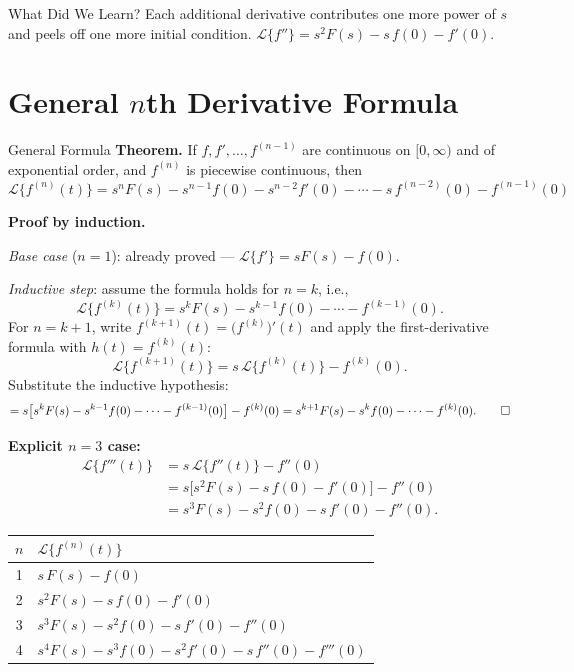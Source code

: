 \documentclass[12pt,a4paper]{article}
\begin{document}
\begin{learnbox}{What Did We Learn?}
Each additional derivative contributes one more power of $s$ and peels
off one more initial condition. $\mathcal{L}\{f''\} = s^2F(s) -
s\,f(0) - f'(0)$.
\end{learnbox}

\section{General \texorpdfstring{$n$}{n}th Derivative Formula}

\begin{infobox}{General Formula}
\textbf{Theorem.} If $f, f', \ldots, f^{(n-1)}$ are continuous on
$[0,\infty)$ and of exponential order, and $f^{(n)}$ is piecewise
continuous, then
\[
  \boxed{
    \mathcal{L}\{f^{(n)}(t)\}
    = s^n F(s)
    - s^{n-1}f(0)
    - s^{n-2}f'(0)
    - \cdots
    - s\,f^{(n-2)}(0)
    - f^{(n-1)}(0)
  }
\]

\medskip
\textbf{Proof by induction.}

\emph{Base case} ($n=1$): already proved --- $\mathcal{L}\{f'\} =
sF(s) - f(0)$. \checkmark

\emph{Inductive step}: assume the formula holds for $n=k$, i.e.,
\[
  \mathcal{L}\{f^{(k)}(t)\}
  = s^k F(s) - s^{k-1}f(0) - \cdots - f^{(k-1)}(0).
\]
For $n = k+1$, write $f^{(k+1)}(t) = \bigl(f^{(k)}\bigr)'(t)$ and apply
the first-derivative formula with $h(t) = f^{(k)}(t)$:
\[
  \mathcal{L}\{f^{(k+1)}(t)\}
  = s\,\mathcal{L}\{f^{(k)}(t)\} - f^{(k)}(0).
\]
Substitute the inductive hypothesis:
\[
  = s\bigl[s^k F(s) - s^{k-1}f(0) - \cdots - f^{(k-1)}(0)\bigr]
    - f^{(k)}(0)
  = s^{k+1}F(s) - s^k f(0) - \cdots - f^{(k)}(0). \qed
\]

\medskip
\textbf{Explicit $n=3$ case:}
\begin{align*}
  \mathcal{L}\{f'''(t)\}
  &= s\,\mathcal{L}\{f''(t)\} - f''(0) \\
  &= s\bigl[s^2 F(s) - s\,f(0) - f'(0)\bigr] - f''(0) \\
  &= s^3 F(s) - s^2 f(0) - s\,f'(0) - f''(0).
\end{align*}
\end{infobox}

\medskip
\begin{center}
\begin{tabular}{@{}c l@{}}
\toprule
$n$ & $\mathcal{L}\{f^{(n)}(t)\}$ \\
\midrule
1 & $s\,F(s) - f(0)$ \\
2 & $s^2 F(s) - s\,f(0) - f'(0)$ \\
3 & $s^3 F(s) - s^2 f(0) - s\,f'(0) - f''(0)$ \\
4 & $s^4 F(s) - s^3 f(0) - s^2 f'(0) - s\,f''(0) - f'''(0)$ \\
\bottomrule
\end{tabular}
\end{center}
\end{document}
